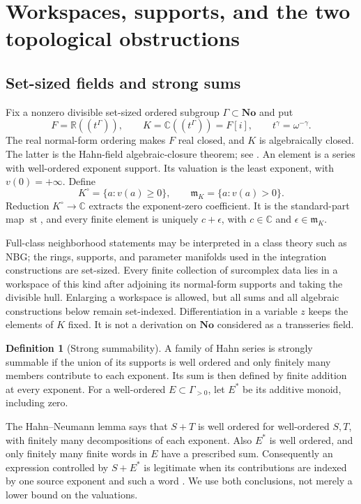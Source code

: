 \documentclass[11pt,letterpaper]{article}
\theoremstyle{definition}
\newtheorem{definition}[theorem]{Definition}
\theoremstyle{remark}
\newcommand{\No}{\mathbf{No}}
\newcommand{\R}{\mathbb R}
\newcommand{\C}{\mathbb C}
\newcommand{\m}{\mathfrak m}
\newcommand{\st}{\operatorname{st}}
\numberwithin{equation}{section}
\begin{document}
\section{Workspaces, supports, and the two topological obstructions}\label{sec:foundations}
\subsection{Set-sized fields and strong sums}
Fix a nonzero divisible set-sized ordered subgroup $\Gamma\subset\No$ and put
\begin{equation}\label{eq:workspace}
F=\R((t^\Gamma)),\qquad K=\C((t^\Gamma))=F[i],\qquad
 t^\gamma=\omega^{-\gamma}.
\end{equation}
The real normal-form ordering makes $F$ real closed, and $K$ is algebraically closed. The latter is the Hahn-field algebraic-closure theorem; see \cite[Corollary 4]{Poonen}. An element is a series with well-ordered exponent support. Its valuation is the least exponent, with $v(0)=+\infty$. Define
\[
K^\circ=\{a:v(a)\ge0\},\qquad \m_K=\{a:v(a)>0\}.
\]
Reduction $K^\circ\to\C$ extracts the exponent-zero coefficient. It is the standard-part map $\st$, and every finite element is uniquely $c+\epsilon$, with $c\in\C$ and $\epsilon\in\m_K$.

Full-class neighborhood statements may be interpreted in a class theory such as NBG; the rings, supports, and parameter manifolds used in the integration constructions are set-sized. Every finite collection of surcomplex data lies in a workspace of this kind after adjoining its normal-form supports and taking the divisible hull. Enlarging a workspace is allowed, but all sums and all algebraic constructions below remain set-indexed. Differentiation in a variable $z$ keeps the elements of $K$ fixed. It is not a derivation on $\No$ considered as a transseries field.

\begin{definition}[Strong summability]
A family of Hahn series is strongly summable if the union of its supports is well ordered and only finitely many members contribute to each exponent. Its sum is then defined by finite addition at every exponent. For a well-ordered $E\subset\Gamma_{>0}$, let $E^*$ be its additive monoid, including zero.
\end{definition}
The Hahn--Neumann lemma says that $S+T$ is well ordered for well-ordered $S,T$, with finitely many decompositions of each exponent. Also $E^*$ is well ordered, and only finitely many finite words in $E$ have a prescribed sum. Consequently an expression controlled by $S+E^*$ is legitimate when its contributions are indexed by one source exponent and such a word \cite{Neumann,Poonen}. We use both conclusions, not merely a lower bound on the valuations.
\end{document}
